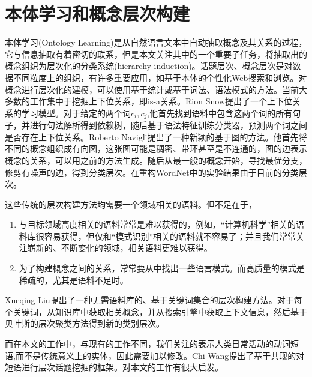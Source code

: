 \section{本体学习和概念层次构建}
本体学习(Ontology Learning)是从自然语言文本中自动抽取概念及其关系的过程，它与信息抽取有着密切的联系，但是本文关注其中的一个重要子任务，将抽取出的概念组织为层次化的分类系统(hierarchy induction)。话题层次、概念层次是对数据不同粒度上的组织，有许多重要应用，如基于本体的个性化Web搜索和浏览\cite{gauch2003ontology}。对概念进行层次化的建模，可以使用基于统计或基于词法、语法模式的方法。当前大多数的工作集中于挖掘上下位关系，即is-a关系。Rion Snow\cite{snow2004learning}提出了一个上下位关系的学习模型。对于给定的两个词$c_i,c_j$,他首先找到语料中包含这两个词的所有句子，并进行句法解析得到依赖树，随后基于语法特征训练分类器，预测两个词之间是否存在上下位关系。Roberto Navigli\cite{navigli2011graph}提出了一种新颖的基于图的方法。他首先将不同的概念组织成有向图，这张图可能是稠密、带环甚至是不连通的，图的边表示概念的关系，可以用之前的方法生成。随后从最一般的概念开始，寻找最优分支，修剪有噪声的边，得到分类层次。在重构WordNet中的实验结果由于目前的分类层次。

这些传统的层次构建方法均需要一个领域相关的语料。但不足在于，
\begin{enumerate}
\item 与目标领域高度相关的语料常常是难以获得的，例如，``计算机科学''相关的语料库很容易获得，但仅和``模式识别''相关的语料就不容易了；并且我们常常关注崭新的、不断变化的领域，相关语料更难以获得。
\item 为了构建概念之间的关系，常常要从中找出一些语言模式。而高质量的模式是稀疏的，尤其是语料不足时。
\end{enumerate}
Xueqing Liu\cite{liu2012automatic}提出了一种无需语料库的、基于关键词集合的层次构建方法。对于每个关键词，从知识库中获取相关概念，并从搜索引擎中获取上下文信息，然后基于贝叶斯的层次聚类方法得到新的类别层次。

而在本文的工作中，与现有的工作不同，我们关注的表示人类日常活动的动词短语,而不是传统意义上的实体，因此需要加以修改。Chi Wang\cite{wang2013phrase}提出了基于共现的对短语进行层次话题挖掘的框架。对本文的工作有很大启发。


